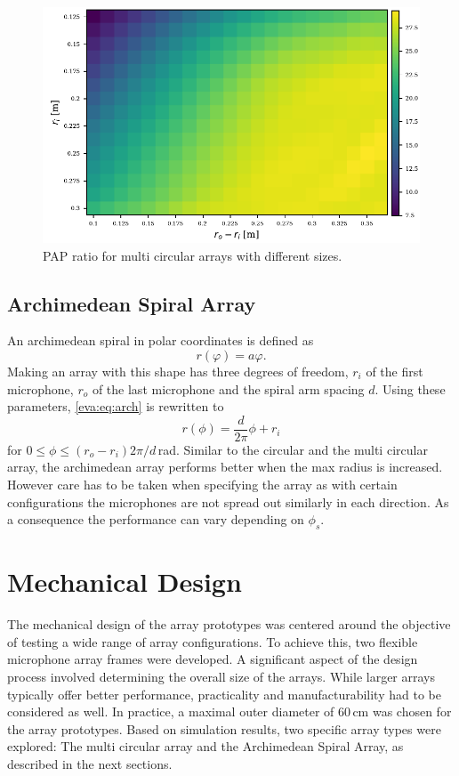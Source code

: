 \newpage
\begin{figure}[ht]
	\centering
	\includegraphics[]{images/5_array_evaluation/fancy_pap.pdf}
	\caption{PAP ratio for multi circular arrays with different
		sizes.}
	\label{aev:fig:FancyPap}
\end{figure}


\subsection{Archimedean Spiral Array}
An archimedean spiral in polar coordinates is defined as
\begin{equation}
	\label{eva:eq:arch}
	r(\varphi) = a \varphi.
\end{equation}
Making an array with this shape has three degrees of freedom,
$r_i$ of the first microphone, $r_o$ of the last microphone and the
spiral arm spacing $d$.
Using these parameters, \eqref{eva:eq:arch} is rewritten to
\begin{equation}
	r(\phi) = \frac{d}{2\pi} \phi + r_i
\end{equation}
for $0 \leq \phi \leq (r_o - r_i) 2 \pi / d$\,rad.
Similar to the circular and the multi circular array,
the archimedean array performs better when the max
radius is increased.
However care has to be taken when specifying the array
as with certain configurations the microphones are not
spread out similarly in each direction.
As a consequence the performance can vary depending
on $\phi_s$.

\newpage
\section{Mechanical Design}
The mechanical design of the array prototypes was centered around the objective of testing a wide range of array configurations.
To achieve this, two flexible microphone array frames were developed.
A significant aspect of the design process involved determining the overall size of the arrays.
While larger arrays typically offer better performance, practicality and manufacturability had to be considered as well.
In practice, a maximal outer diameter of 60\,cm was chosen for the array prototypes.
Based on simulation results, two specific array types were explored: The multi circular array and the Archimedean Spiral Array, as described in the next sections.

